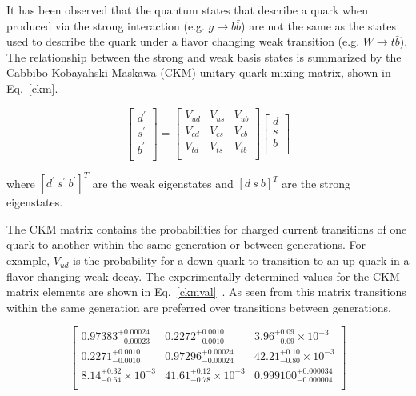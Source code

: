 It has been observed that the quantum states that describe a quark when produced via the strong interaction (e.g. $g\rightarrow b\bar{b}$) are not the same as the states used to describe the quark under a flavor changing weak transition (e.g. $W\rightarrow t\bar{b}$). The relationship between the strong and weak basis states is summarized by the Cabbibo-Kobayahski-Maskawa (CKM) unitary quark mixing matrix, shown in Eq.~\ref{ckm}.

\begin{equation}
\left[ \begin{array}{c}
d^{'}	\\
s^{'}	\\
b^{'}	\\
\end{array}\right]
=
\left[ \begin{array}{ccc}
V_{ud} & V_{us} & V_{ub} \\
V_{cd} & V_{cs} & V_{cb} \\
V_{td} & V_{ts} & V_{tb} \\
\end{array}\right]
\left[ \begin{array}{c}
d	\\
s	\\
b	\\
\end{array}\right]
\label{ckm}
\end{equation}

\noindent where $[d^{'}~s^{'}~b^{'}]^{T}$ are the weak eigenstates and $[d~s~b]^{T}$ are the strong eigenstates.

The CKM matrix contains the probabilities for charged current transitions of one quark to another within the same generation or between generations. For example, $V_{ud}$ is the probability for a down quark to transition to an up quark in a flavor changing weak decay. The experimentally determined values for the CKM matrix elements are shown in Eq.~\ref{ckmval}~\cite{Yao:2006px}. As seen from this matrix transitions within the same generation are preferred over transitions between generations.

\begin{equation}
\left[ \begin{array}{ccc}
0.97383^{+0.00024}	_{-0.00023}	&	0.2272^{+0.0010}_{-0.0010}			&	3.96^{+0.09}_{-0.09} \times 10^{-3}		\\
0.2271^{+0.0010}_{-0.0010}		&	0.97296^{+0.00024}_{-0.00024}		&	42.21^{+0.10}_{-0.80} \times 10^{-3}		\\
8.14^{+0.32}_{-0.64} \times 10^{-3}	&	41.61^{+0.12}_{-0.78} \times 10^{-3}		&	0.999100^{+0.000034}_{-0.000004}		\\
\end{array}\right]
\label{ckmval}
\end{equation}

